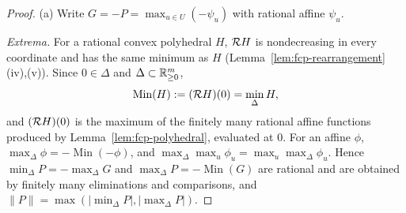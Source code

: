 \begin{proof}
(a) Write $G=-P=\max_{u\in U}(-\psi_u)$ with rational affine $\psi_u$.

\emph{Extrema.} For a rational convex polyhedral $H$, $\mathcal{R} H$ is nondecreasing in every coordinate and has the same
minimum as $H$ (Lemma~\ref{lem:fcp-rearrangement}(iv),(v)). Since $0\in\Delta$ and $\Delta\subset\mathbb{R}^m_{\ge0}$,
\[
 \operatorname{Min}(H):=(\mathcal{R} H)(0)=\min_\Delta H,
\]
and $(\mathcal{R} H)(0)$ is the maximum of the finitely many rational affine functions produced by
Lemma~\ref{lem:fcp-polyhedral}, evaluated at $0$. For an affine $\phi$, $\max_\Delta\phi=-\operatorname{Min}(-\phi)$, and
$\max_\Delta\max_u\phi_u=\max_u\max_\Delta\phi_u$. Hence $\min_\Delta P=-\max_\Delta G$ and
$\max_\Delta P=-\operatorname{Min}(G)$ are rational and are obtained by finitely many eliminations and comparisons, and
$\|P\|=\max(|\min_\Delta P|,|\max_\Delta P|)$.


\end{proof}
